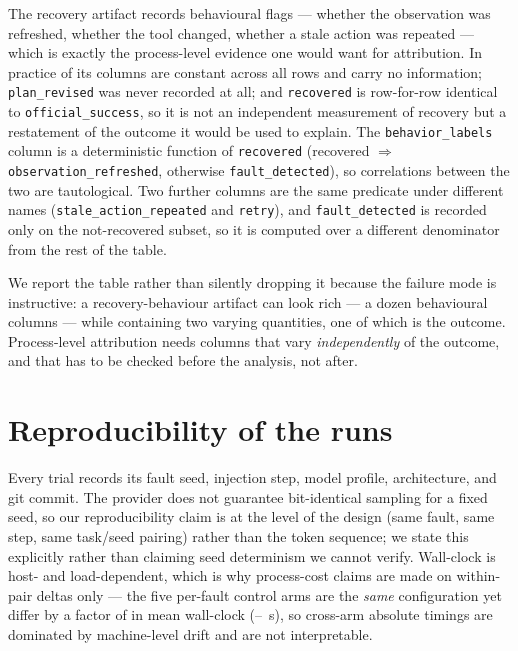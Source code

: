The recovery artifact records behavioural flags --- whether the observation was
refreshed, whether the tool changed, whether a stale action was repeated --- which
is exactly the process-level evidence one would want for attribution. In practice
\RecDegenerateCount{} of its columns are constant across all \RecN{} rows and
carry no information; \texttt{plan\_revised} was never recorded at all; and
\texttt{recovered} is row-for-row identical to \texttt{official\_success}, so it
is not an independent measurement of recovery but a restatement of the outcome it
would be used to explain. The \texttt{behavior\_labels} column is a deterministic
function of \texttt{recovered} (recovered $\Rightarrow$
\texttt{observation\_refreshed}, otherwise \texttt{fault\_detected}), so
correlations between the two are tautological. Two further columns are the same
predicate under different names (\texttt{stale\_action\_repeated} and
\texttt{retry}), and \texttt{fault\_detected} is recorded only on the
not-recovered subset, so it is computed over a different denominator from the
rest of the table.

We report the table rather than silently dropping it because the failure mode is
instructive: a recovery-behaviour artifact can look rich --- a dozen behavioural
columns --- while containing two varying quantities, one of which is the outcome.
Process-level attribution needs columns that vary \emph{independently} of the
outcome, and that has to be checked before the analysis, not after.



\section{Reproducibility of the runs}
\label{app:runs}

Every trial records its fault seed, injection step, model profile, architecture,
and git commit. The provider does not guarantee bit-identical sampling for a fixed
seed, so our reproducibility claim is at the level of the design (same fault, same
step, same task/seed pairing) rather than the token sequence; we state this
explicitly rather than claiming seed determinism we cannot verify. Wall-clock is
host- and load-dependent, which is why process-cost claims are made on within-pair
deltas only --- the five per-fault control arms are the \emph{same} configuration
yet differ by a factor of \NoiseFloorRatio{} in mean wall-clock
(\NoiseFloorLo--\NoiseFloorHi{}~s), so cross-arm absolute timings are dominated by
machine-level drift and are not interpretable.

